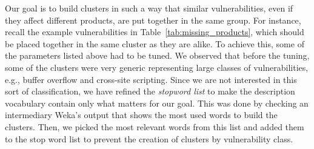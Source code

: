 

Our goal is to build clusters in such a way that similar vulnerabilities, even if they affect different products, are put together in the same group. 
For instance, recall the example vulnerabilities in Table~\ref{tab:missing_products}, which should be placed together in the same cluster as they are alike.
To achieve this, some of the parameters listed above had to be tuned.
We observed that before the tuning, some of the clusters were very generic representing large classes of vulnerabilities, e.g., buffer overflow and cross-site scripting. 
Since we are not interested in this sort of classification, we have refined the \emph{stopword list} to make the description vocabulary contain only what matters for our goal.
This was done by checking an intermediary Weka's output that shows the most used words to build the clusters.
Then, we picked the most relevant words from this list and added them to the stop word list to prevent the creation of clusters by vulnerability class.


